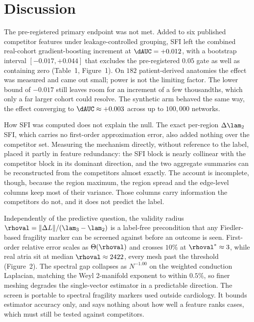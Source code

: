 \section{Discussion}

The pre-registered primary endpoint was not met. Added to six published
competitor features under leakage-controlled grouping, SFI left the combined
real-cohort gradient-boosting increment at $\dAUC=+0.012$, with a bootstrap
interval $[-0.017,+0.044]$ that excludes the pre-registered $0.05$ gate as well
as containing zero (Table~1, Figure~1). On $182$ patient-derived anatomies the
effect was measured and came out small; power is not the limiting factor. The
lower bound of $-0.017$ still leaves room for an increment of a few thousandths,
which only a far larger cohort could resolve. The synthetic arm behaved the same way, the effect converging
to $\dAUC\approx+0.003$ across up to $100{,}000$ networks.

How SFI was computed does not explain the null. The exact per-region $\Delta\lam_2$
SFI, which carries no first-order approximation error, also added nothing over
the competitor set. Measuring the mechanism directly, without reference to the
label, placed it partly in feature redundancy: the SFI block is nearly collinear
with the competitor block in its dominant direction, and the two aggregate
summaries can be reconstructed from the competitors almost exactly. The account
is incomplete, though, because the region maximum, the region spread and the
edge-level columns keep most of their variance. Those columns carry information
the competitors do not, and it does not predict the label.

Independently of the predictive question, the validity radius
$\rhoval=\lVert\Delta L\rVert/(\lam_3-\lam_2)$ is a label-free precondition that
any Fiedler-based fragility marker can be screened against before an outcome is
seen. First-order relative error scales as $\Theta(\rhoval)$ and crosses $10\%$
at $\rhoval^\ast\approx3$, while real atria sit at median $\rhoval\approx2422$,
every mesh past the threshold (Figure~2). The spectral gap collapses as
$N^{-1.00}$ on the weighted conduction Laplacian, matching the Weyl 2-manifold
exponent to within $0.5\%$, so finer meshing degrades the single-vector
estimator in a predictable direction. The screen is portable to spectral
fragility markers used outside cardiology. It bounds estimator accuracy only,
and says nothing about how well a feature ranks cases, which must still be
tested against competitors.


